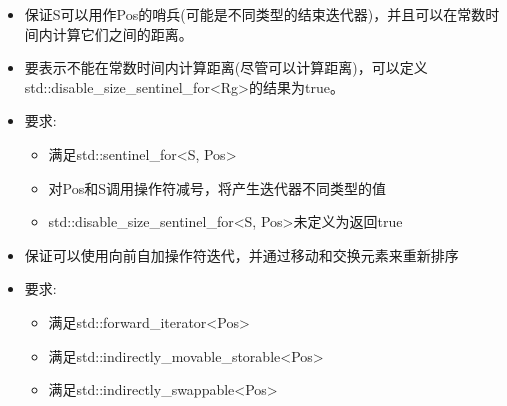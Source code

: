 
\begin{itemize}
\item
保证S可以用作Pos的哨兵(可能是不同类型的结束迭代器)，并且可以在常数时间内计算它们之间的距离。

\item
要表示不能在常数时间内计算距离(尽管可以计算距离)，可以定义std::disable\_size\_sentinel\_for<Rg>的结果为true。

\item
要求:
\begin{itemize}
\item
满足std::sentinel\_for<S, Pos>

\item
对Pos和S调用操作符减号，将产生迭代器不同类型的值

\item
std::disable\_size\_sentinel\_for<S, Pos>未定义为返回true
\end{itemize}
\end{itemize}



\begin{itemize}
\item
保证可以使用向前自加操作符迭代，并通过移动和交换元素来重新排序

\item
要求:
\begin{itemize}
\item
满足std::forward\_iterator<Pos>

\item
满足std::indirectly\_movable\_storable<Pos>

\item
满足std::indirectly\_swappable<Pos>
\end{itemize}
\end{itemize}


